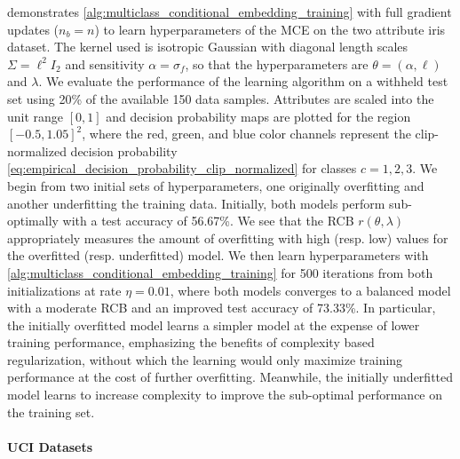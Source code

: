\documentclass{llncs}
\begin{document}
	 demonstrates \cref{alg:multiclass_conditional_embedding_training} with full gradient updates ($n_{b} = n$) to learn hyperparameters of the \gls{MCE} on the two attribute iris dataset. The kernel used is isotropic Gaussian with diagonal length scales $\Sigma = \ell^{2} I_{2}$ and sensitivity $\alpha = \sigma_{f}$, so that the hyperparameters are $\theta = (\alpha, \ell)$ and $\lambda$. We evaluate the performance of the learning algorithm on a withheld test set using 20\% of the available 150 data samples. Attributes are scaled into the unit range $[0, 1]$ and decision probability maps are plotted for the region $[-0.5, 1.05]^{2}$, where the red, green, and blue color channels represent the clip-normalized decision probability \eqref{eq:empirical_decision_probability_clip_normalized} for classes $c = 1, 2, 3$. We begin from two initial sets of hyperparameters, one originally overfitting and another underfitting the training data. Initially, both models perform sub-optimally with a test accuracy of 56.67\%. We see that the \gls{RCB} $r(\theta, \lambda)$ appropriately measures the amount of overfitting with high (resp. low) values for the overfitted (resp. underfitted) model. We then learn hyperparameters with \cref{alg:multiclass_conditional_embedding_training} for 500 iterations from both initializations at rate $\eta = 0.01$, where both models converges to a balanced model with a moderate \gls{RCB} and an improved test accuracy of 73.33\%. In particular, the initially overfitted model learns a simpler model at the expense of lower training performance, emphasizing the benefits of complexity based regularization, without which the learning would only maximize training performance at the cost of further overfitting. Meanwhile, the initially underfitted model learns to increase complexity to improve the sub-optimal performance on the training set.
	
	\paragraph{UCI Datasets}
	
\end{document}
